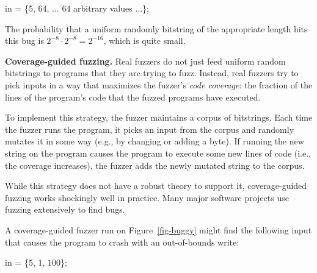 \documentclass[
  letterpaper,
]{scrbook}
\newenvironment{Shaded}{\begin{snugshade}}{\end{snugshade}}
\newcommand{\DecValTok}[1]{\textcolor[rgb]{0.68,0.00,0.00}{#1}}
\newcommand{\NormalTok}[1]{\textcolor[rgb]{0.00,0.23,0.31}{#1}}
\newcommand{\OperatorTok}[1]{\textcolor[rgb]{0.37,0.37,0.37}{#1}}
\theoremstyle{definition}
\theoremstyle{plain}
\theoremstyle{plain}
\theoremstyle{remark}
\begin{document}
\begin{Shaded}
\begin{Highlighting}[]
\NormalTok{in }\OperatorTok{=} \OperatorTok{\{}\DecValTok{5}\OperatorTok{,} \DecValTok{64}\OperatorTok{,} \OperatorTok{...} \DecValTok{64}\NormalTok{ arbitrary values }\OperatorTok{...\};}
\end{Highlighting}
\end{Shaded}

The probability that a uniform randomly bitstring of the appropriate
length hits this bug is \(2^{-8} \cdot 2^{-8} = 2^{-16}\), which is
quite small.

\textbf{Coverage-guided fuzzing.} Real fuzzers do not just feed uniform
random bitstrings to programs that they are trying to fuzz. Instead,
real fuzzers try to pick inputs in a way that maximizes the fuzzer's
\emph{code coverage}: the fraction of the lines of the program's code
that the fuzzed programs have executed.


To implement this strategy, the fuzzer maintains a corpus of bitstrings.
Each time the fuzzer runs the program, it picks an input from the corpus
and randomly mutates it in some way (e.g., by changing or adding a
byte). If running the new string on the program causes the program to
execute some new lines of code (i.e., the coverage increases), the
fuzzer adds the newly mutated string to the corpus.

While this strategy does not have a robust theory to support it,
coverage-guided fuzzing works shockingly well in practice. Many major
software projects use fuzzing extensively to find bugs.

A coverage-guided fuzzer run on Figure~\ref{fig-buggy} might find the
following input that causes the program to crash with an out-of-bounds
write:

\begin{Shaded}
\begin{Highlighting}[]
\NormalTok{in }\OperatorTok{=} \OperatorTok{\{}\DecValTok{5}\OperatorTok{,} \DecValTok{1}\OperatorTok{,} \DecValTok{100}\OperatorTok{\};}
\end{Highlighting}
\end{Shaded}
\end{document}
